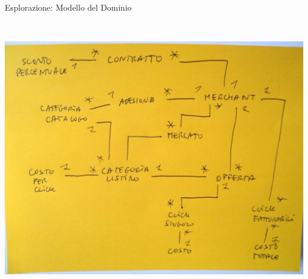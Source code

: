 \begin{frame}{Esplorazione: Modello del Dominio}
\begin{columns}[T]
\begin{column}{.5\textwidth}
				\\ \vspace*{0.3cm}
				\hspace*{-0.3cm} \includegraphics[scale=0.13]{images/domain-3}
		    \end{column}
		 \end{columns}
	\end{frame}

